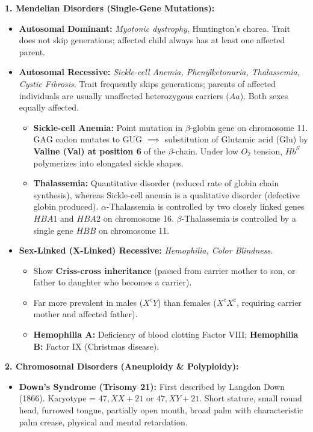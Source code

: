 \documentclass[10pt,a4paper]{article}
\begin{document}
\begin{trapbox}
\textbf{1. Mendelian Disorders (Single-Gene Mutations):}
\begin{itemize}
  \item \textbf{Autosomal Dominant:} \textit{Myotonic dystrophy}, Huntington's chorea. Trait does not skip generations; affected child always has at least one affected parent.
  \item \textbf{Autosomal Recessive:} \textit{Sickle-cell Anemia, Phenylketonuria, Thalassemia, Cystic Fibrosis}. Trait frequently skips generations; parents of affected individuals are usually unaffected heterozygous carriers ($Aa$). Both sexes equally affected.
  \begin{itemize}
    \item \textbf{Sickle-cell Anemia:} Point mutation in $\beta$-globin gene on chromosome 11. GAG codon mutates to GUG $\implies$ substitution of Glutamic acid (Glu) by \textbf{Valine (Val) at position 6} of the $\beta$-chain. Under low $O_2$ tension, $Hb^S$ polymerizes into elongated sickle shapes.
    \item \textbf{Thalassemia:} Quantitative disorder (reduced rate of globin chain synthesis), whereas Sickle-cell anemia is a qualitative disorder (defective globin produced). $\alpha$-Thalassemia is controlled by two closely linked genes $HBA1$ and $HBA2$ on chromosome 16. $\beta$-Thalassemia is controlled by a single gene $HBB$ on chromosome 11.
  \end{itemize}
  \item \textbf{Sex-Linked (X-Linked) Recessive:} \textit{Hemophilia, Color Blindness}.
  \begin{itemize}
    \item Show \textbf{Criss-cross inheritance} (passed from carrier mother to son, or father to daughter who becomes a carrier).
    \item Far more prevalent in males ($X^c Y$) than females ($X^c X^c$, requiring carrier mother and affected father).
    \item \textbf{Hemophilia A:} Deficiency of blood clotting Factor VIII; \textbf{Hemophilia B:} Factor IX (Christmas disease).
  \end{itemize}
\end{itemize}
\textbf{2. Chromosomal Disorders (Aneuploidy \& Polyploidy):}
\begin{itemize}
  \item \textbf{Down's Syndrome (Trisomy 21):} First described by Langdon Down (1866). Karyotype = $47, XX+21$ or $47, XY+21$. Short stature, small round head, furrowed tongue, partially open mouth, broad palm with characteristic palm crease, physical and mental retardation.

\end{itemize}
\end{trapbox}
\end{document}
